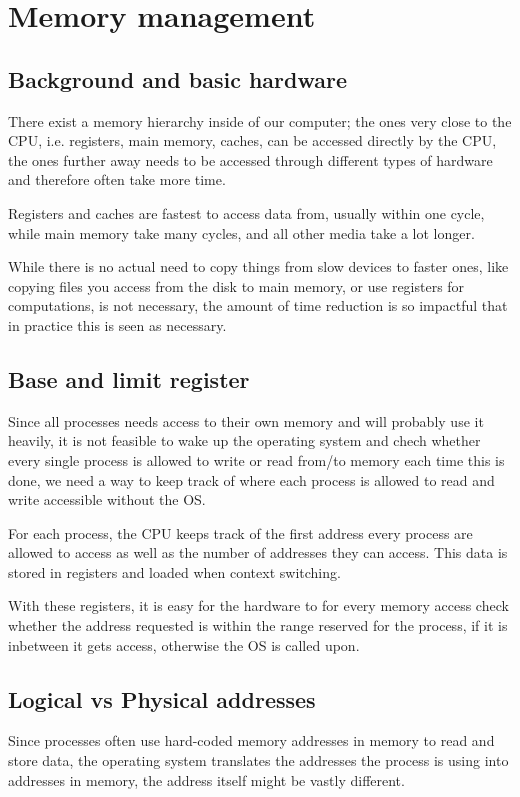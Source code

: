 \chapter{Memory management}
\section{Background and basic hardware}
There exist a memory hierarchy inside of our computer; the ones very close to the CPU, i.e. registers, main memory, caches, can be accessed directly by the CPU, the ones further away needs to be accessed through different types of hardware and therefore often take more time.

Registers and caches are fastest to access data from, usually within one cycle, while main memory take many cycles, and all other media take a lot longer.

While there is no actual need to copy things from slow devices to faster ones, like copying files you access from the disk to main memory, or use registers for computations, is not necessary, the amount of time reduction is so impactful that in practice this is seen as necessary.

\section{Base and limit register}
Since all processes needs access to their own memory and will probably use it heavily, it is not feasible to wake up the operating system and chech whether every single process is allowed to write or read from/to memory each time this is done, we need a way to keep track of where each process is allowed to read and write accessible without the OS.

For each process, the CPU keeps track of the first address every process are allowed to access as well as the number of addresses they can access. This data is stored in registers and loaded when context switching.

With these registers, it is easy for the hardware to for every memory access check whether the address requested is within the range reserved for the process, if it is inbetween it gets access, otherwise the OS is called upon.

\section{Logical vs Physical addresses}
Since processes often use hard-coded memory addresses in memory to read and store data, the operating system translates the addresses the process is using into addresses in memory, the address itself might be vastly different.

